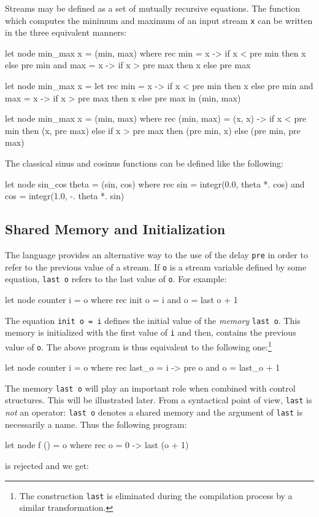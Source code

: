 \documentclass[11pt,titlepage,twoside]{report}
\begin{document}
Streams may be defined as a set of mutually recursive equations.  The
function which computes the minimum and maximum of an input stream
\verb-x- can be written in the three equivalent manners:
\begin{runverbatim}
let node min_max x = (min, max) where
  rec min = x -> if x < pre min then x else pre min
  and max = x -> if x > pre max then x else pre max
\end{runverbatim}

\begin{runverbatim}
let node min_max x =
  let rec min = x -> if x < pre min then x else pre min
  and max = x -> if x > pre max then x else pre max in
  (min, max)
\end{runverbatim}

\begin{runverbatim}
let node min_max x = (min, max) where
  rec (min, max) = (x, x) -> if x < pre min then (x, pre max)
                             else if x > pre max then (pre min, x)
                             else (pre min, pre max)
\end{runverbatim}

\noindent The classical sinus and cosinus functions can be defined like the
following:
\begin{runverbatim}[continue,include=integr]
let node sin_cos theta = (sin, cos) where
  rec sin = integr(0.0, theta *. cos)
  and cos = integr(1.0, -. theta *. sin)
\end{runverbatim}


\subsection{Shared Memory and Initialization}
The language provides an alternative way to the use of the delay
\verb-pre- in order to refer to the previous value of a stream. If
\verb-o- is a stream variable defined by some equation, \verb-last o-
refers to the last value of \verb-o-. For example:
\begin{runverbatim}
let node counter i = o where
  rec init o = i
  and o = last o + 1
\end{runverbatim}
The equation \verb-init o = i- defines the initial value of the {\em
  memory} \verb-last o-. This memory is initialized with the first
value of \verb-i- and then, contains the previous value of
\verb-o-. The above program is thus equivalent to the following
one:\footnote{The construction \texttt{last} is eliminated during the
  compilation process by a similar transformation.}
\begin{runverbatim}
let node counter i = o where
  rec last_o = i -> pre o
  and o = last_o + 1
\end{runverbatim}
The memory \verb-last o- will play an important role when combined
with control structures. This will be illustrated later.
From a syntactical point of view, \verb-last- is {\em not} an
operator: \verb-last o- denotes a shared memory and the argument of
\verb-last- is necessarily a name. Thus the following program:
\begin{runverbatim}[fail]
let node f () = o where
  rec o = 0 -> last (o + 1)
\end{runverbatim}
is rejected and we get:
\runverbatimerr{}
\end{document}
